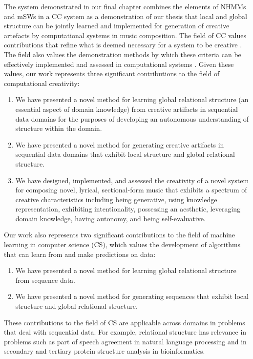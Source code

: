 \documentclass[phd,electronic,oneside,twosidetoc,letterpaper,chaptercenter,parttop,lol,lof,lot]{byumsphd}
\begin{document}
The system demonstrated in our final chapter combines the elements of NHMMs and mSWs in a CC system as a demonstration of our thesis that local and global structure can be jointly learned and implemented for generation of creative artefacts by computational systems in music composition. The field of CC values contributions that refine what is deemed necessary for a system to be creative \cite{colton2015stakeholder}. The field also values the demonstration methods by which these criteria can be effectively implemented and assessed in computational systems \cite{Jordanous2014}. Given these values, our work represents three significant contributions to the field of computational creativity:
\begin{enumerate}
\item We have presented a novel method for learning global relational structure (an essential aspect of domain knowledge) from creative artifacts in sequential data domains for the purposes of developing an autonomous understanding of structure within the domain.
\item We have presented a novel method for generating creative artifacts in sequential data domains that exhibit local structure and global relational structure.
\item We have designed, implemented, and assessed the creativity of a novel system for composing novel, lyrical, sectional-form music that exhibits a spectrum of creative characteristics including being generative, using knowledge representation, exhibiting intentionality, possessing an aesthetic, leveraging domain knowledge, having autonomy, and being self-evaluative.
\end{enumerate}

Our work also represents two significant contributions to the field of machine learning in computer science (CS), which values the development of algorithms that can learn from and make predictions on data:
\begin{enumerate}
\item We have presented a novel method for learning global relational structure from sequence data.
\item We have presented a novel method for generating sequences that exhibit local structure and global relational structure.
\end{enumerate}

These contributions to the field of CS are applicable across domains in problems that deal with sequential data. For example, relational structure has relevance in problems such as part of speech agreement in natural language processing and in secondary and tertiary protein structure analysis in bioinformatics.
\end{document}
